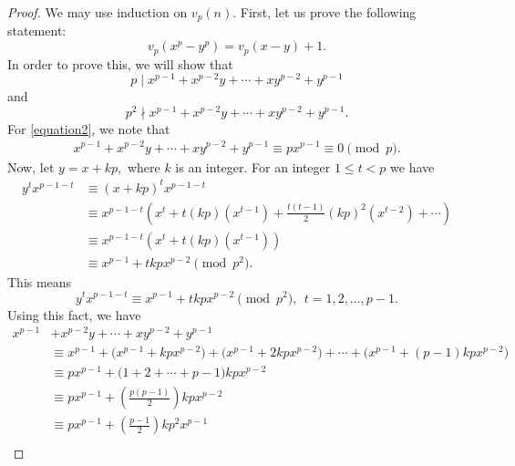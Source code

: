 \documentclass[main.tex]{subfile}
\begin{document}
    
    \begin{proof}
        We may use induction on $v_p(n).$ First, let us prove the following statement:
            \begin{equation}\label{equation1}
                v_p(  x^p - y^p ) = v_p  ( x - y ) + 1.
            \end{equation}
        In order to prove this, we will show that
            \begin{equation}\label{equation2}
                p \mid x^{p-1}+x^{p-2}y+\cdots+xy^{p-2}+y^{p-1}
            \end{equation}
        and
            \begin{equation}\label{equation3}
                p^2 \nmid x^{p-1}+x^{p-2}y+\cdots+xy^{p-2}+y^{p-1}.
            \end{equation}
        For \eqref{equation2}, we note that
        \begin{align*}
        x^{p-1}+x^{p-2}y+\cdots+xy^{p-2}+y^{p-1} \equiv px^{p-1} \equiv 0 \pmod p .
        \end{align*}
        Now, let $y=x+kp,$ where $k$ is an integer. For an integer $ 1  \leq t <p$ we have
            \begin{align*}
                y^t x^{p-1-t} & \equiv (x+kp)^t x^{p-1-t} \\
                & \equiv x^{p-1-t} \left( x^t + t(kp)(x^{t-1})+ \frac{t(t-1)}{2} (kp)^2 (x^{t-2}) +\cdots \right) \\
                & \equiv x^{p-1-t} \left( x^t + t(kp)(x^{t-1}) \right) \\
                & \equiv x^{p-1}+tkpx^{p-2} \pmod{p^2}.
            \end{align*}
        This means
            \[
            y^t x^{p-1-t} \equiv x^{p-1}+tkpx^{p-2} \pmod{p^2}, \ \ t=1,2,\ldots,p-1.
            \]
        Using this fact, we have
            \begin{align*}
                x^{p-1}& +x^{p-2}y+\cdots+xy^{p-2}+y^{p-1} \\
                & \equiv x^{p-1}+\big(x^{p-1}+kpx^{p-2}\big)+\big(x^{p-1}+2kpx^{p-2}\big)+\cdots+\big(x^{p-1} +(p-1)kpx^{p-2}\big) \\
                & \equiv px^{p-1} + \big(1+2+\cdots+p-1\big)kpx^{p-2} \\
                & \equiv px^{p-1} + \left( \frac{p(p-1)}{2} \right) kpx^{p-2} \\
                & \equiv px^{p-1} + \left( \frac{p-1}{2} \right) kp^2x^{p-1} \\

\end{align*}
\end{proof}
\end{document}
